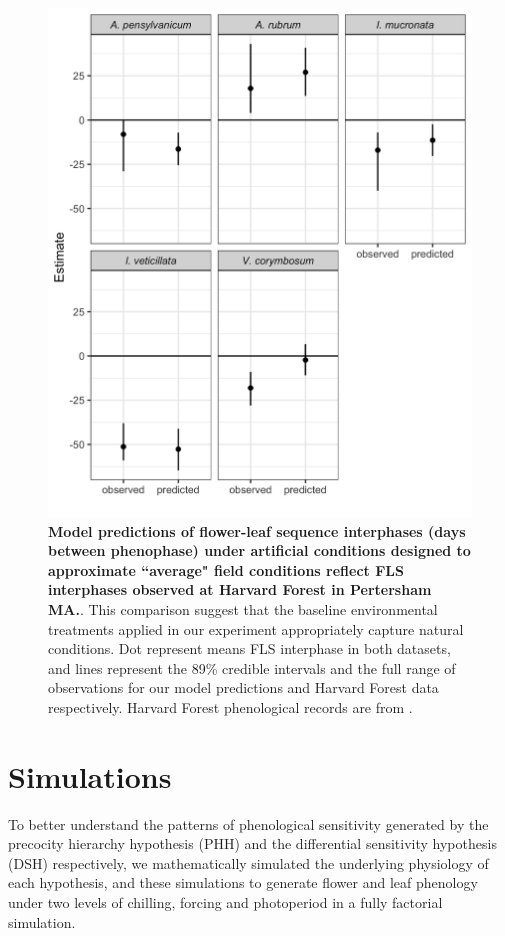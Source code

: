 \documentclass[11pt]{article}
\begin{document}
  \begin{figure}[!ht]
    \centering
 \includegraphics[width=\textwidth]{..//Plots/fieldmodcomparisions.jpeg}
    \caption{\textbf{Model predictions of flower-leaf sequence interphases (days between phenophase) under artificial conditions designed to approximate ``average" field conditions reflect FLS interphases observed at Harvard Forest in Pertersham MA.}. This comparison suggest that the baseline environmental treatments  applied in our experiment appropriately capture natural conditions. Dot represent means FLS interphase in both datasets, and lines represent the 89\% credible intervals and the full range of observations for our model predictions and Harvard Forest data respectively.  Harvard Forest phenological records are from \citet{Okeefe2015}.}
    \label{fig:validate}
\end{figure}
\pagebreak

\section*{Simulations}
\noident To better understand the patterns of phenological sensitivity generated by the precocity hierarchy hypothesis (PHH) and the differential sensitivity hypothesis (DSH) respectively, we mathematically simulated the underlying physiology of each hypothesis, and these simulations to generate flower and leaf phenology under two levels of chilling, forcing and photoperiod in a fully factorial simulation.\\
\end{document}
